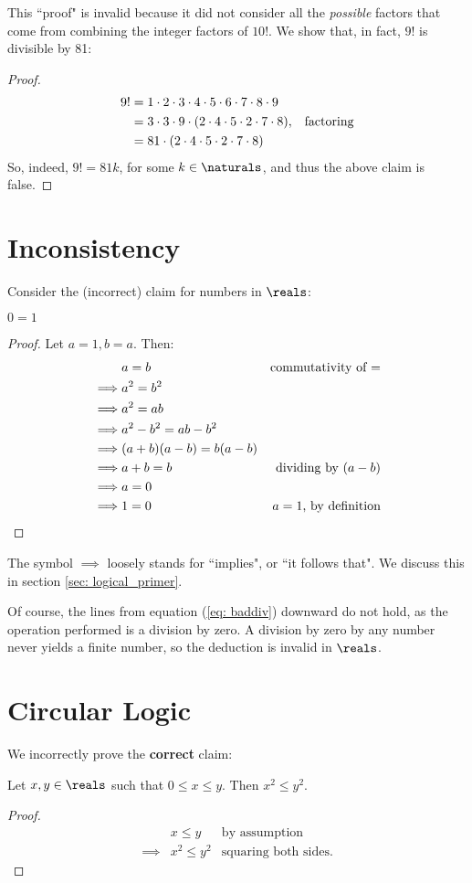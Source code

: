 \documentclass[../proofs.tex]{subfiles}
\begin{document}
This ``proof" is invalid because it did not consider all the \emph{possible}
factors that come from combining the integer factors of $10!$. We show
that, in fact, $9!$ is divisible by 81:
\begin{proof}
  \begin{align}
    9! &= 1 \cdot 2 \cdot 3 \cdot 4 \cdot 5 \cdot 6 \cdot 7 \cdot 8 \cdot 9 \\
       &= 3 \cdot 3 \cdot 9 \cdot (2 \cdot 4 \cdot 5 \cdot 2 \cdot 7 \cdot 8),
        & \text{factoring}\\
       &= 81 \cdot (2 \cdot 4 \cdot 5 \cdot 2 \cdot 7 \cdot 8)
  \end{align}
  So, indeed, $9! = 81k$, for some $k \in \naturals$, and thus the above
  claim is false.
\end{proof}

\section{Inconsistency}
Consider the (incorrect) claim for numbers in $\reals$:
\begin{claim}
  $0 = 1$
\end{claim}
\begin{proof}
  Let $a = 1, b = a$. Then:
  \begin{align}
    &a = b & \text{commutativity of $=$} \\
    \implies &a^2 = b^2 \\
    \implies &a^2 = ab  \\
    \implies &a^2 - b^2 = ab - b^2 \\
    \implies &(a + b)(a - b) = b(a - b) \\
    \implies &a + b = b & \text{dividing by $(a-b)$} \label{eq: baddiv} \\
    \implies &a = 0 \\
    \implies &1 = 0 & \text{$a = 1$, by definition}
  \end{align}
\end{proof}
The symbol $\implies$ loosely stands for ``implies", or ``it follows that".
We discuss this in section \ref{sec: logical_primer}.

Of course, the lines from equation (\ref{eq: baddiv}) downward do not hold, as
the operation performed is a division by zero. A division by zero by any number
never yields a finite number, so the deduction is invalid in $\reals$.

\section{Circular Logic}
We incorrectly prove the \textbf{correct} claim:
\begin{claim}
  Let $x, y \in \reals$ such that $0 \leq x \leq y$. Then $x^2 \leq y^2$.
\end{claim}
\begin{proof}
  \begin{align}
    &x \leq y & \text{by assumption} \label{eq: sqassump} \\
    \implies &x^2 \leq y^2 & \text{squaring both sides.} \label{eq: sqconseq}
  \end{align}
\end{proof}
\end{document}
